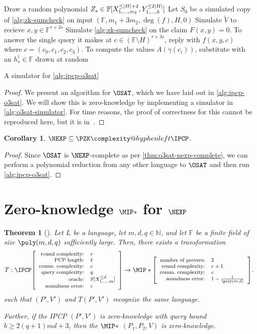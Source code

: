 \documentclass[english,12pt]{reedthesis}
\makeatletter
\theoremstyle{plain}
\newtheorem{thm}{Theorem}[section]
\newtheorem{cor}[cor]{Corollary}
\theoremstyle{definition}
\theoremstyle{remark}
\DeclarePairedDelimiter{\abs}{\lvert}{\rvert}
\newcommand{\ldipcp}[6]{%
  \ensuremath%
  \mleft[{\footnotesize\begin{array}{r l}
    \text{round complexity:} & #1 \\
    \text{PCP length:} & #2 \\
    \text{comm.\ complexity:} & #3 \\
    \text{query complexity:} & #4 \\
    \text{oracle:} & #5 \\
    \text{soundness error:} & #6
  \end{array}}\mright]%
}
\newcommand{\mipstar}[4]{%
  \ensuremath%
  \mleft[{\footnotesize\begin{array}{r l}
    \text{number of provers:} & #1 \\
    \text{round complexity:} & #2 \\
    \text{comm.\ complexity:} & #3 \\
    \text{soundness error:} & #4
  \end{array}}\mright]%
}
\newcommand{\PZKIPCP}{%
  \PZK\complexity@hyphenleft\IPCP
}
\makeatother
\begin{document}
\begin{algorithm}[htbp]
  Draw a random polynomial
  $Z_{s} \in \mathbb{F}[X_{1, \ldots, m_{2}}^{\le \abs{H}+2}, Y_{1, \ldots, k}^{\le 2\abs{H}}]$\;
  Let $S_{0}$ be a simulated copy of \cref{alg:zk-sumcheck} on input
  $(\mathbb{F}, m_{1} + 3m_{2}, \deg(f), H, 0)$\;
  Simulate $\tilde{V}$ to recieve $x, y \in \mathbb{F}^{r + 3s}$\;
  Simulate \cref{alg:zk-sumcheck} on the claim $F(x, y) = 0$. To answer the
  single query it makes at $c \in (\mathbb{F} \setminus H)^{r+3s}$, reply with
  $f(x, y, c)$ where $c = (c_{0}, c_{1}, c_{2}, c_{3})$. To compute the values
  $A(\gamma(c_{i}))$, substitute with an $h_{s}^{i} \in \mathbb{F}$ drawn at random\;
  \caption{A simulator for \cref{alg:ipcp-o3sat}~\cite[p.\ 15.37]{CFGS22}}\label{alg:o3sat-simulator}
\end{algorithm}

\begin{proof}
  We present an algorithm for $\OSAT$, which we have laid out in
  \cref{alg:ipcp-o3sat}. We will show this is zero-knowledge by implementing a
  simulator in \cref{alg:o3sat-simulator}. For time reasons, the proof of
  correctness for this cannot be reproduced here, but it is in~\cite[Theorem
  14.2]{CFGS22}.
\end{proof}

\begin{cor}\label{nexp-pzkipcp}
  $\NEXP \subseteq \PZKIPCP$.
\end{cor}

\begin{proof}
  Since $\OSAT$ is $\NEXP$-complete as per \cref{thm:o3sat-nexp-complete}, we
  can perform a polynomial reduction from any other language to $\OSAT$ and then
  run \cref{alg:ipcp-o3sat}.
\end{proof}

\section{Zero-knowledge $\MIP*$ for $\NEXP$}\label{sec:zk-mipstar-nexp}

\begin{thm}[{\cite[Lemma 9.1]{CFGS22}}]\label{thm:lift-ipcp-mip}
  Let $L$ be a language, let $m, d, q \in \mathbb{N}$, and let $\mathbb{F}$ be a finite
  field of size $\poly(m, d, q)$ sufficiently large. Then, there exists a
  transformation
  \begin{equation*}
    T: \IPCP\ldipcp{r}{\ell}{c}{q}{\mathbb{F}[X_{1, \ldots, m}^{\le d}]}{\varepsilon}
    \rightarrow \MIP*\mipstar{2}{r+1}{c}{1 - \frac{1}{\poly(m, d)}}.
  \end{equation*}
  such that $(P', V')$ and $T(P', V')$ recognize the same language.

  Further, if the IPCP $(P', V')$ is zero-knowledge with query bound
  $b \ge 2(q+1)md + 3$, then the $\MIP*$ $(P_{1}, P_{2}, V)$ is zero-knowledge.
\end{thm}
\end{document}
